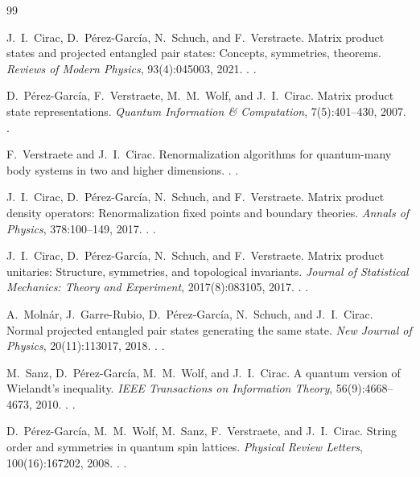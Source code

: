 \begin{thebibliography}{99}

J.~I.~Cirac, D.~P{\'e}rez-Garc{\'i}a, N.~Schuch, and F.~Verstraete.
\newblock Matrix product states and projected entangled pair states: Concepts,
  symmetries, theorems.
\newblock \emph{Reviews of Modern Physics}, 93(4):045003, 2021.
\newblock {}. .

D.~P{\'e}rez-Garc{\'i}a, F.~Verstraete, M.~M.~Wolf, and J.~I.~Cirac.
\newblock Matrix product state representations.
\newblock \emph{Quantum Information \& Computation}, 7(5):401--430, 2007.
\newblock {}.

F.~Verstraete and J.~I.~Cirac.
\newblock Renormalization algorithms for quantum-many body systems in two and
  higher dimensions.
.
\newblock {}.

J.~I.~Cirac, D.~P{\'e}rez-Garc{\'i}a, N.~Schuch, and F.~Verstraete.
\newblock Matrix product density operators: Renormalization fixed points and
  boundary theories.
\newblock \emph{Annals of Physics}, 378:100--149, 2017.
\newblock {}. .

J.~I.~Cirac, D.~P{\'e}rez-Garc{\'i}a, N.~Schuch, and F.~Verstraete.
\newblock Matrix product unitaries: Structure, symmetries, and topological
  invariants.
\newblock \emph{Journal of Statistical Mechanics: Theory and Experiment},
  2017(8):083105, 2017.
\newblock {}. .

A.~Moln{\'a}r, J.~Garre-Rubio, D.~P{\'e}rez-Garc{\'i}a, N.~Schuch, and
  J.~I.~Cirac.
\newblock Normal projected entangled pair states generating the same state.
\newblock \emph{New Journal of Physics}, 20(11):113017, 2018.
\newblock {}. .

M.~Sanz, D.~P{\'e}rez-Garc{\'i}a, M.~M.~Wolf, and J.~I.~Cirac.
\newblock A quantum version of {Wielandt}'s inequality.
\newblock \emph{IEEE Transactions on Information Theory}, 56(9):4668--4673,
  2010.
\newblock {}. .

D.~P{\'e}rez-Garc{\'i}a, M.~M.~Wolf, M.~Sanz, F.~Verstraete, and J.~I.~Cirac.
\newblock String order and symmetries in quantum spin lattices.
\newblock \emph{Physical Review Letters}, 100(16):167202, 2008.
\newblock {}. .


\end{thebibliography}
